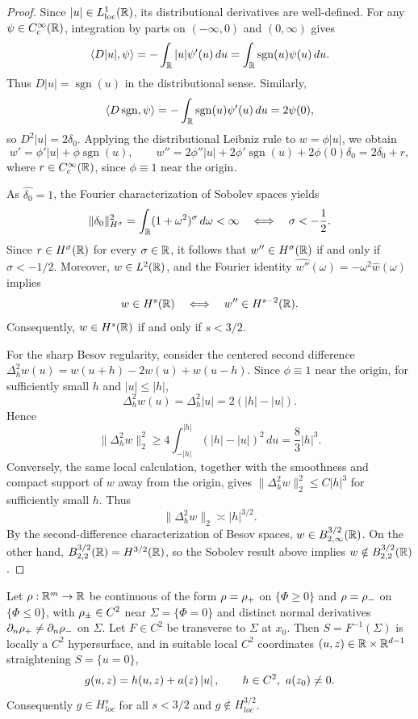 \begin{proof}
Since $|u|\in L^1_{\mathrm{loc}}(\mathbb{R})$, its distributional derivatives are
well-defined. For any $\psi\in C_c^\infty(\mathbb{R})$, integration by parts on
$(-\infty,0)$ and $(0,\infty)$ gives
\[
\langle D|u|,\psi\rangle
=-\int_{\mathbb{R}}|u|\psi'(u)\,du
=\int_{\mathbb{R}}\operatorname{sgn}(u)\psi(u)\,du.
\]
Thus $D|u|=\operatorname{sgn}(u)$ in the distributional sense. Similarly,
\[
\langle D\operatorname{sgn},\psi\rangle
=-\int_{\mathbb{R}}\operatorname{sgn}(u)\psi'(u)\,du
=2\psi(0),
\]
so $D^2|u|=2\delta_0$. Applying the distributional Leibniz rule to
$w=\phi|u|$, we obtain
\[
w'=\phi'|u|+\phi\operatorname{sgn}(u),\qquad
w''=2\phi''|u|+2\phi'\operatorname{sgn}(u)+2\phi(0)\delta_0
=2\delta_0+r,
\]
where $r\in C_c^\infty(\mathbb{R})$, since $\phi\equiv1$ near the origin.

As $\widehat{\delta_0}=1$, the Fourier characterization of Sobolev spaces
yields
\[
\|\delta_0\|_{H^\sigma}^2
=\int_{\mathbb{R}}(1+\omega^2)^\sigma\,d\omega<\infty
\quad\Longleftrightarrow\quad \sigma<-\frac12.
\]
Since $r\in H^\sigma(\mathbb{R})$ for every $\sigma\in\mathbb{R}$, it follows that
$w''\in H^\sigma(\mathbb{R})$ if and only if $\sigma<-1/2$.
Moreover, $w\in L^2(\mathbb{R})$, and the Fourier identity
$\widehat{w''}(\omega)=-\omega^2\widehat w(\omega)$ implies
\[
w\in H^s(\mathbb{R})\quad\Longleftrightarrow\quad
w''\in H^{s-2}(\mathbb{R}).
\]
Consequently, $w\in H^s(\mathbb{R})$ if and only if $s<3/2$.

For the sharp Besov regularity, consider the centered second difference
$\Delta_h^2w(u)=w(u+h)-2w(u)+w(u-h)$. Since $\phi\equiv1$ near
the origin, for sufficiently small $h$ and $|u|\le |h|$,
\[
\Delta_h^2w(u)=\Delta_h^2|u|
=2(|h|-|u|).
\]
Hence
\[
\|\Delta_h^2w\|_2^2
\ge 4\int_{-|h|}^{|h|}(|h|-|u|)^2\,du
=\frac83|h|^3.
\]
Conversely, the same local calculation, together with the smoothness
and compact support of $w$ away from the origin, gives
$\|\Delta_h^2w\|_2^2\le C|h|^3$ for sufficiently small $h$.
Thus
\[
\|\Delta_h^2w\|_2\asymp |h|^{3/2}.
\]
By the second-difference characterization of Besov spaces,
$w\in B^{3/2}_{2,\infty}(\mathbb{R})$. On the other hand,
$B^{3/2}_{2,2}(\mathbb{R})=H^{3/2}(\mathbb{R})$, so the Sobolev result above
implies $w\notin B^{3/2}_{2,2}(\mathbb{R})$.
\end{proof}


\begin{theorem}
\label{app:thm-normalform-initial}
Let $\rho:\mathbb{R}^m\to\mathbb{R}$ be continuous of the form $\rho=\rho_+$ on $\{\Phi\ge0\}$ and
$\rho=\rho_-$ on $\{\Phi\le0\}$, with $\rho_\pm\in C^2$ near
$\Sigma=\{\Phi=0\}$ and distinct normal derivatives $\partial_n\rho_+\neq\partial_n\rho_-$
on $\Sigma$. Let $F\in C^2$ be transverse to $\Sigma$ at $x_0$. Then
$S=F^{-1}(\Sigma)$ is locally a $C^2$ hypersurface, and in suitable local $C^2$
coordinates $(u,z)\in\mathbb{R}\times\mathbb{R}^{d-1}$ straightening $S=\{u=0\}$,
\[
g(u,z)=h(u,z)+a(z)\abs{u},\qquad h\in C^2,\ a(z_0)\neq0 .
\]
Consequently $g\in H^s_{loc}$ for all $s<3/2$ and $g\notin H^{3/2}_{loc}$.
\end{theorem}

